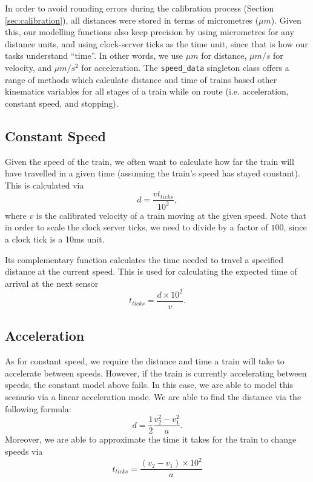 \documentclass[12pt, titlepage]{article}
\begin{document}
    In order to avoid rounding errors during the calibration process (Section \ref{sec:calibration}), all distances were stored in terms of micrometres ($\mu m$). Given this, our modelling functions also keep precision by using micrometres for any distance units, and using clock-server ticks as the time unit, since that is how our tasks understand ``time''. In other words, we use $\mu m$ for distance, $\mu m / s$ for velocity, and $\mu m / s^2$ for acceleration. The \verb`speed_data` singleton class offers a range of methods which calculate distance and time of trains based other kinematics variables for all stages of a train while on route (i.e. acceleration, constant speed, and stopping). 
    
    \subsection{Constant Speed}
    \label{sec:modelling-constant}
    
    Given the speed of the train, we often want to calculate how far the train will have travelled in a given time (assuming the train's speed has stayed constant). This is calculated via
    \[
        d = \frac{vt_{ticks}}{10^2},
    \]
    where $v$ is the calibrated velocity of a train moving at the given speed. Note that in order to scale the clock server ticks, we need to divide by a factor of $100$, since a clock tick is a 10ms unit.
    
    Its complementary function calculates the time needed to travel a specified distance at the current speed. This is used for calculating the expected time of arrival at the next sensor
    \[
        t_{ticks} = \frac{d \times 10^2}{v}.
    \]

    \subsection{Acceleration}
    
    As for constant speed, we require the distance and time a train will take to accelerate between speeds. However, if the train is currently accelerating between speeds, the constant model above fails. In this case, we are able to model this scenario via a linear acceleration mode. We are able to find the distance via the following formula:
    \[
        d = \frac{1}{2} \frac{v_2^2 - v_1^2}{a}.
    \]
    Moreover, we are able to approximate the time it takes for the train to change speeds via
    \[
        t_{ticks} = \frac{(v_2 - v_1) \times 10^2}{a}
    \]
    
\end{document}
